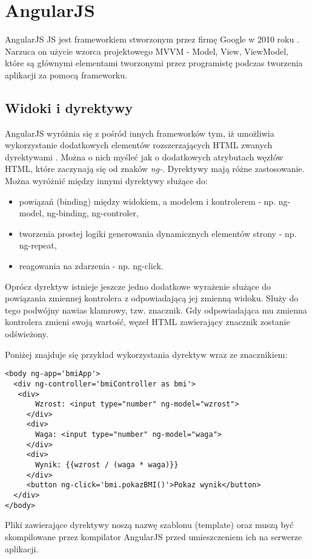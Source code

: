\section{AngularJS}

AngularJS JS jest frameworkiem stworzonym przez firmę Google w 2010 roku \cite{angular-book}. Narzuca on użycie wzorca projektowego MVVM - Model, View, ViewModel, które są głównymi elementami tworzonymi przez programistę podczas tworzenia aplikacji za pomocą frameworku. 

\subsection{Widoki i dyrektywy}
AngularJS wyróżnia się z pośród innych frameworków tym, iż umożliwia wykorzystanie dodatkowych elementów rozszerzających HTML zwanych dyrektywami \cite{angular-book}. Można o nich myśleć jak o dodatkowych atrybutach węzłów HTML, które zaczynają się od znaków \textit{ng-}. Dyrektywy mają różne zastosowanie. Można wyróżnić między innymi dyrektywy służące do:
\begin{itemize}
\item powiązań (binding) między widokiem, a modelem i kontrolerem - np. ng-model, ng-binding, ng-controler,
\item tworzenia prostej logiki generowania dynamicznych elementów strony - np. ng-repeat,
\item reagowania na zdarzenia - np. ng-click.
\end{itemize}

Oprócz dyrektyw istnieje jeszcze jedno dodatkowe wyrażenie służące do powiązania zmiennej kontrolera z odpowiadającą jej zmienną widoku. Służy do tego podwójny nawias klamrowy, tzw. znacznik. Gdy odpowiadająca mu zmienna kontrolera zmieni swoją wartość, węzeł HTML zawierający znacznik zostanie odświeżony.

Poniżej znajduje się przykład wykorzystania dyrektyw wraz ze znacznikiem:

\begin{lstlisting}[language=HTML5]
<body ng-app='bmiApp'>
  <div ng-controller='bmiController as bmi'>
   <div>
       Wzrost: <input type="number" ng-model="wzrost">
     </div>
     <div>
       Waga: <input type="number" ng-model="waga">
     </div>
     <div>
       Wynik: {{wzrost / (waga * waga)}}
     </div>
     <button ng-click='bmi.pokazBMI()'>Pokaz wynik</button>
  </div>
</body>
\end{lstlisting}

Pliki zawierające dyrektywy noszą nazwę szablonu (template) oraz muszą być skompilowane przez kompilator AngularJS przed umieszczeniem ich na serwerze aplikacji.


